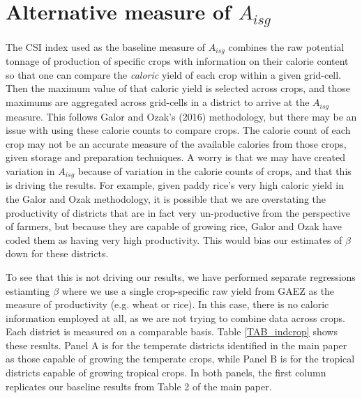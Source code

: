 \documentclass[11pt]{article}
\begin{document}
\section{Alternative measure of $A_{isg}$}
The CSI index used as the baseline measure of $A_{isg}$ combines the raw potential tonnage of production of specific crops with information on their calorie content so that one can compare the \textit{caloric} yield of each crop within a given grid-cell. Then the maximum value of that caloric yield is selected across crops, and those maximums are aggregated across grid-cells in a district to arrive at the $A_{isg}$ measure. This follows Galor and Ozak's (2016) methodology, but there may be an issue with using these calorie counts to compare crops. The calorie count of each crop may not be an accurate measure of the available calories from those crops, given storage and preparation techniques. A worry is that we may have created variation in $A_{isg}$ because of variation in the calorie counts of crops, and that this is driving the results. For example, given paddy rice's very high caloric yield in the Galor and Ozak methodology, it is possible that we are overstating the productivity of districts that are in fact very un-productive from the perspective of farmers, but because they are capable of growing rice, Galor and Ozak have coded them as having very high productivity. This would bias our estimates of $\beta$ down for these districts. 

To see that this is not driving our results, we have performed separate regressions estiamting $\beta$ where we use a single crop-specific raw yield from GAEZ as the measure of productivity (e.g. wheat or rice). In this case, there is no caloric information employed at all, as we are not trying to combine data across crops. Each district is measured on a comparable basis. Table \ref{TAB_indcrop} shows these results. Panel A is for the temperate districts identified in the main paper as those capable of growing the temperate crops, while Panel B is for the tropical districts capable of growing tropical crops. In both panels, the first column replicates our baseline results from Table 2 of the main paper.
\end{document}
